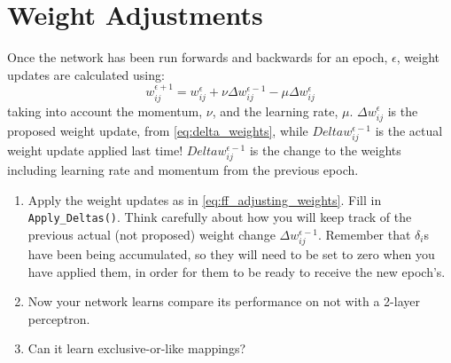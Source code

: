 \documentclass[a4paper,10pt]{article}
\begin{document}
\section{Weight Adjustments}
Once the network has been run forwards and backwards for an epoch, $\epsilon$, weight updates are calculated using:
\begin{equation}
\label{eq:ff_adjusting_weights}
w_{ij}^{\epsilon +1} = w_{ij}^{\epsilon} +  \nu \Delta w_{ij}^{\epsilon - 1}  - \mu \Delta w_{ij}^{\epsilon}
\end{equation}
taking into account the momentum, $\nu$, and the learning rate, $\mu$.  $\Delta w_{ij}^{\epsilon}$ is the proposed weight update, from \autoref{eq:delta_weights}, while $Delta w_{ij}^{\epsilon - 1}$  is the actual weight update applied last time! $Delta w_{ij}^{\epsilon - 1}$ is the change to the weights including learning rate and momentum from the previous epoch.

\begin{enumerate}

\item Apply the weight updates as in \autoref{eq:ff_adjusting_weights}. Fill in \texttt{Apply\_Deltas()}. Think carefully about how you will keep track of the previous actual (not proposed) weight change $\Delta w_{ij}^{\epsilon-1}$. Remember that $\delta_i$s have been being accumulated, so they will need to be set to zero when you have applied them, in order for them to be ready to receive the new epoch's.

\item Now your network learns compare its performance on not with a 2-layer perceptron.

\item Can it learn exclusive-or-like mappings?


 
 \end{enumerate}

\end{document}
